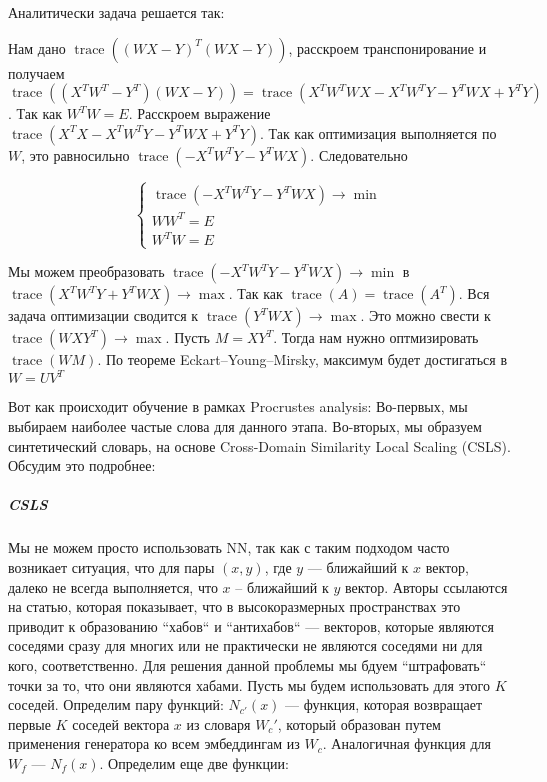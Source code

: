 \documentclass{article}
\begin{document}
    Аналитически задача решается так: 

    Нам дано $\operatorname{trace}( ( WX - Y)^{T} (WX - Y))$, расскроем транспонирование и получаем 
    $\operatorname{trace}( ( X^{T} W^{T} - Y^{T}) (WX - Y)) = \operatorname{trace}( X^{T} W^{T} WX - X^{T} W^{T} Y   - Y^{T} WX + Y^{T} Y)$. 
    Так как $W^{T} W = E$. Расскроем выражение $\operatorname{trace}( X^{T}X - X^{T} W^{T} Y   - Y^{T} WX + Y^{T} Y)$. Так как 
    оптимизация выполняется по $W$, это равносильно $\operatorname{trace}(-X^{T} W^{T} Y   - Y^{T} WX)$. Следовательно

    \[
    \begin{cases}
        \operatorname{trace}(-X^{T} W^{T} Y   - Y^{T} WX) \rightarrow \min \\
        W W^{T} = E \\
        W^{T} W = E
    \end{cases}
    \]

    Мы можем преобразовать $\operatorname{trace}(-X^{T} W^{T} Y   - Y^{T} WX) \rightarrow \min$ в 
    $\operatorname{trace}(X^{T} W^{T} Y  + Y^{T} WX) \rightarrow \max$. Так как $\operatorname{trace}(A) = \operatorname{trace}(A^{T})$.
    Вся задача оптимизации сводится к $\operatorname{trace}(Y^{T} WX) \rightarrow \max$. Это можно свести к $\operatorname{trace}(WXY^{T}) \rightarrow \max$.
    Пусть $M = XY^{T}$. Тогда нам нужно оптмизировать $\operatorname{trace}(WM)$. По теореме Eckart–Young–Mirsky, максимум будет достигаться 
    в $W=UV^{T}$

    \quad

    Вот как происходит обучение в рамках Procrustes analysis:
    Во-первых, мы выбираем наиболее частые слова для данного этапа. Во-вторых, мы образуем синтетический словарь, на основе
    Cross-Domain Similarity Local Scaling (CSLS). Обсудим это подробнее: 


    \subparagraph{CSLS}

    \quad

    Мы не можем просто использовать NN, так как с таким подходом часто возникает ситуация, что для пары
    $(x, y)$, где $y$ --- ближайший к $x$ вектор, далеко не всегда выполняется, что $x$ -- ближайший к $y$ вектор.
    Авторы ссылаются на статью, которая показывает, что в высокоразмерных пространствах это приводит к образованию ``хабов``
    и ``антихабов`` --- векторов, которые являются соседями сразу для многих или не практически не являются соседями ни для кого,
    соответственно. Для решения данной проблемы мы бдуем ``штрафовать`` точки за то, что они являются хабами.
    Пусть мы будем использовать для этого $K$ соседей.
    Определим пару функций: $N_{c'}(x)$ --- функция, которая возвращает первые $K$ соседей вектора $x$ из словаря 
    $W_{c}'$, который образован путем применения генератора ко всем эмбеддингам из $W_{c}$. Аналогичная функция для $W_{f}$
    --- $N_{f}(x)$. Определим еще две функции: 
\end{document}
